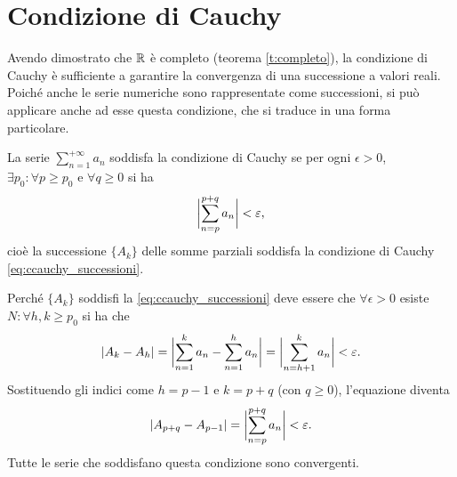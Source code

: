 \section{Condizione di Cauchy}
Avendo dimostrato che $\R$ è completo (teorema \ref{t:completo}), la condizione di Cauchy è sufficiente a garantire la convergenza di una successione a valori reali. Poiché anche le serie numeriche sono rappresentate come successioni, si può applicare anche ad esse questa condizione, che si traduce in una forma particolare.
\begin{definizione}
\label{d:ccauchy_serie}
La serie $\sum_{n=1}^{+\infty}a_n$ soddisfa la condizione di Cauchy se per ogni $\epsilon>0$, $\exists p_0\colon\forall p\geq p_0$ e $\forall q\geq 0$ si ha
\begin{equation}
\label{eq:ccauchy_serie}
\abs[\bigg]{\sum_{n=p}^{p+q}a_n}<\epsilon,
\end{equation}
cioè la successione $\{A_k\}$ delle somme parziali soddisfa la condizione di Cauchy \ref{eq:ccauchy_successioni}.
\end{definizione}
Perché $\{A_k\}$ soddisfi la \ref{eq:ccauchy_successioni} deve essere che $\forall\epsilon>0$ esiste $N\colon\forall h,k\geq p_0$ si ha che
\[
	\abs{A_k-A_h}=\abs[\bigg]{\sum_{n=1}^ka_n-\sum_{n=1}^ha_n}=\abs[\bigg]{\sum_{n=h+1}^ka_n}<\epsilon.
\]
Sostituendo gli indici come $h=p-1$ e $k=p+q$ (con $q\geq 0$), l'equazione diventa
\[
	\abs{A_{p+q}-A_{p-1}}=\abs[\bigg]{\sum_{n=p}^{p+q}a_n}<\epsilon.
\]
Tutte le serie che soddisfano questa condizione sono convergenti.
